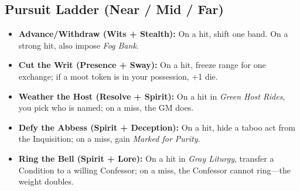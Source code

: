 \subsection*{Pursuit Ladder (Near / Mid / Far)}
\begin{itemize}
\item \textbf{Advance/Withdraw (Wits + Stealth):} On a hit, shift one band. On a strong hit, also impose \emph{Fog Bank}.
\item \textbf{Cut the Writ (Presence + Sway):} On a hit, freeze range for one exchange; if a moot token is in your possession, +1 die.
\item \textbf{Weather the Host (Resolve + Spirit):} On a hit in \emph{Green Host Rides}, you pick who is named; on a miss, the GM does.
\item \textbf{Defy the Abbess (Spirit + Deception):} On a hit, hide a taboo act from the Inquisition; on a miss, gain \emph{Marked for Purity}.
\item \textbf{Ring the Bell (Spirit + Lore):} On a hit in \emph{Gray Liturgy}, transfer a Condition to a willing Confessor; on a miss, the Confessor cannot ring---the weight doubles.
\end{itemize}

